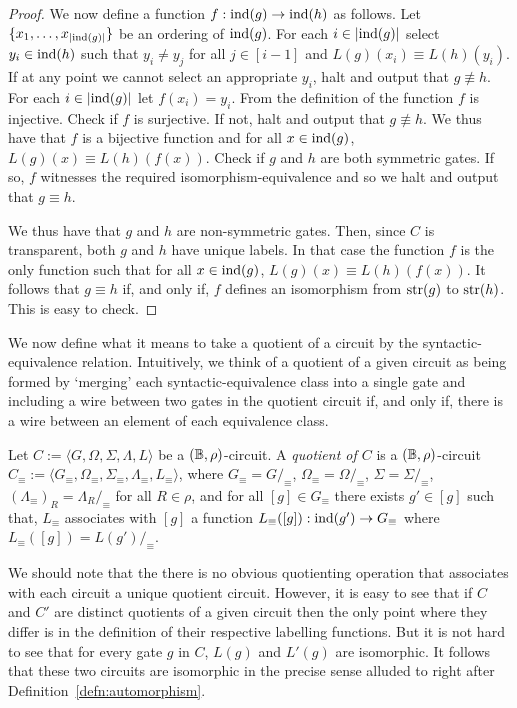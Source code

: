\documentclass[../paper.tex]{subfiles}
\begin{document}
\begin{proof}
  We now define a function $f: \text{\upshape ind}(g) \rightarrow \text{\upshape ind}(h)$ as follows. Let
  $\{x_1, \ldots, x_{\vert \text{\upshape ind}(g)\vert}\}$ be an ordering of $\text{\upshape ind}(g)$. For
  each $i \in \vert \text{\upshape ind}(g) \vert$ select $y_i \in \text{\upshape ind}(h)$ such that $y_i \neq
  y_j$ for all $j \in [i-1]$ and $L(g)(x_i) \equiv L(h)(y_i)$. If at any point
  we cannot select an appropriate $y_i$, halt and output that $g \not\equiv h$.
  For each $i \in \vert \text{\upshape ind}(g) \vert$ let $f(x_i) = y_i$. From the definition
  of the function $f$ is injective. Check if $f$ is surjective. If not, halt and
  output that $g \not\equiv h$. We thus have that $f$ is a bijective function
  and for all $x \in \text{\upshape ind}(g)$, $L(g)(x) \equiv L(h)(f(x))$. Check if $g$
  and $h$ are both symmetric gates. If so, $f$ witnesses the required
  isomorphism-equivalence and so we halt and output that $g \equiv h$.

  We thus have that $g$ and $h$ are non-symmetric gates. Then, since $C$ is
  transparent, both $g$ and $h$ have unique labels. In that case the function
  $f$ is the only function such that for all $x \in \text{\upshape ind}(g)$, $L(g)(x) \equiv
  L(h)(f(x))$. It follows that $g \equiv h$ if, and only if, $f$ defines an
  isomorphism from $\text{str}(g)$ to $\text{str}(h)$. This is easy to check.
\end{proof}

 We now define what it means to take a
quotient of a circuit by the syntactic-equivalence relation. Intuitively, we
think of a quotient of a given circuit as being formed by `merging' each
syntactic-equivalence class into a single gate and including a wire between two
gates in the quotient circuit if, and only if, there is a wire between an
element of each equivalence class.

\begin{definition}
  Let $C := \langle G, \Omega, \Sigma, \Lambda, L \rangle$ be a $(\mathbb{B},
  \rho)$-circuit. A \emph{quotient of $C$} is a $(\mathbb{B}, \rho)$-circuit $C_\equiv
  := \langle G_\equiv , \Omega_\equiv, \Sigma_\equiv , \Lambda_\equiv, L_\equiv
  \rangle$, where $G_\equiv = G /_\equiv$, $\Omega_\equiv = \Omega /_\equiv$,
  $\Sigma = \Sigma /_\equiv$, $(\Lambda_\equiv)_R = \Lambda_R /_\equiv$ for all
  $R \in \rho$, and for all $[g] \in G_\equiv$ there exists $g' \in [g]$ such
  that, $L_\equiv$ associates with $[g]$ a function $L_\equiv([g]) : \text{\upshape ind}(g')
  \rightarrow G_\equiv$ where $L_\equiv([g]) = L(g')/_\equiv$.
\end{definition}

We should note that the there is no obvious quotienting operation that
associates with each circuit a unique quotient circuit. However, it is easy to
see that if $C$ and $C'$ are distinct quotients of a given circuit then the only
point where they differ is in the definition of their respective labelling
functions. But it is not hard to see that for every gate $g$ in $C$, $L(g)$ and
$L'(g)$ are isomorphic.  It follows that these two circuits are
isomorphic in the precise sense alluded to right after Definition~\ref{defn:automorphism}.
\end{document}
